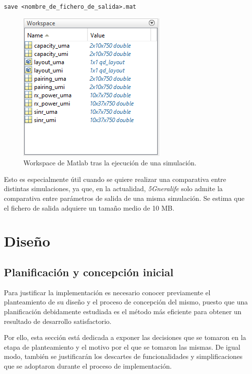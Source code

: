 \begin{lstlisting}[style=Matlab-editor, basicstyle=\tiny]
save <nombre_de_fichero_de_salida>.mat
\end{lstlisting}

\begin{figure}[h!]
	\centering
    \includegraphics{imagenes/workspace.PNG}
	\caption{Workspace de Matlab tras la ejecución de una simulación.}
	\label{fig:workspace}
\end{figure}

Esto es especialmente útil cuando se quiere realizar una comparativa entre distintas simulaciones, ya que, en la actualidad, \textit{5Gneralife} solo admite la comparativa entre parámetros de salida de una misma simulación. Se estima que el fichero de salida adquiere un tamaño medio de 10 MB.

\section{Diseño}

\subsection{Planificación y concepción inicial}

Para justificar la implementación es necesario conocer previamente el planteamiento de su diseño y el proceso de concepción del mismo, puesto que una planificación debidamente estudiada es el método más eficiente para obtener un resultado de desarrollo satisfactorio.

Por ello, esta sección está dedicada a exponer las decisiones que se tomaron en la etapa de planteamiento y el motivo por el que se tomaron las mismas. De igual modo, también se justificarán los descartes de funcionalidades y simplificaciones que se adoptaron durante el proceso de implementación.

